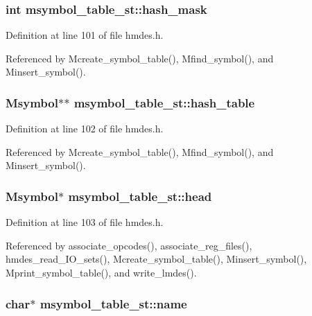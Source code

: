 \subsubsection{\setlength{\rightskip}{0pt plus 5cm}int \bf{msymbol\_\-table\_\-st::hash\_\-mask}}\label{structmsymbol__table__st_832d3b8f64ae18cf30abc10107b2e5a3}




Definition at line 101 of file hmdes.h.

Referenced by Mcreate\_\-symbol\_\-table(), Mfind\_\-symbol(), and Minsert\_\-symbol().
\subsubsection{\setlength{\rightskip}{0pt plus 5cm}\bf{Msymbol}$\ast$$\ast$ \bf{msymbol\_\-table\_\-st::hash\_\-table}}\label{structmsymbol__table__st_5d5af8510a253417360b60a16c8543c4}




Definition at line 102 of file hmdes.h.

Referenced by Mcreate\_\-symbol\_\-table(), Mfind\_\-symbol(), and Minsert\_\-symbol().
\subsubsection{\setlength{\rightskip}{0pt plus 5cm}\bf{Msymbol}$\ast$ \bf{msymbol\_\-table\_\-st::head}}\label{structmsymbol__table__st_de6159e81bced21f9c5fb2149459aac3}




Definition at line 103 of file hmdes.h.

Referenced by associate\_\-opcodes(), associate\_\-reg\_\-files(), hmdes\_\-read\_\-IO\_\-sets(), Mcreate\_\-symbol\_\-table(), Minsert\_\-symbol(), Mprint\_\-symbol\_\-table(), and write\_\-lmdes().
\subsubsection{\setlength{\rightskip}{0pt plus 5cm}char$\ast$ \bf{msymbol\_\-table\_\-st::name}}\label{structmsymbol__table__st_f56efe18ecd3a218034e0c73c9cb3375}




